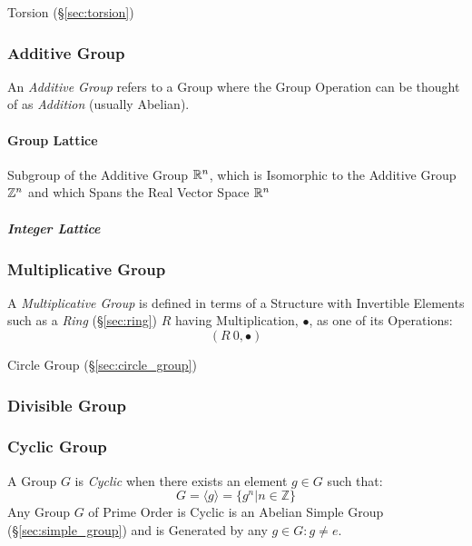 Torsion (\S\ref{sec:torsion})



\subsubsection{Additive Group}\label{sec:additive_group}

An \emph{Additive Group} refers to a Group where the Group Operation
can be thought of as \emph{Addition} (usually Abelian).



\paragraph{Group Lattice}\label{sec:group_lattice}\hfill

Subgroup of the Additive Group $\mathbb{R}^n$, which is Isomorphic to the Additive
Group $\mathbb{Z}^n$ and which Spans the Real Vector Space $\mathbb{R}^n$



\subparagraph{Integer Lattice}\label{sec:integer_lattice}\hfill



\subsubsection{Multiplicative Group}\label{sec:multiplicative_group}

A \emph{Multiplicative Group} is defined in terms of a Structure with
Invertible Elements such as a \emph{Ring} (\S\ref{sec:ring}) $R$
having Multiplication, $\bullet$, as one of its Operations:
\[
  (R \ {0}, \bullet)
\]

Circle Group (\S\ref{sec:circle_group})



\subsubsection{Divisible Group}\label{sec:divisible_group}

\subsubsection{Cyclic Group}\label{sec:cyclic_group}

A Group $G$ is \emph{Cyclic} when there exists an element $g \in G$ such that:
\[
    G = \langle g \rangle = \{ g^n | n \in \mathbb{Z} \}
\]
Any Group $G$ of Prime Order is Cyclic is an Abelian Simple Group
(\S\ref{sec:simple_group}) and is Generated by any $g \in G : g \neq
e$.

